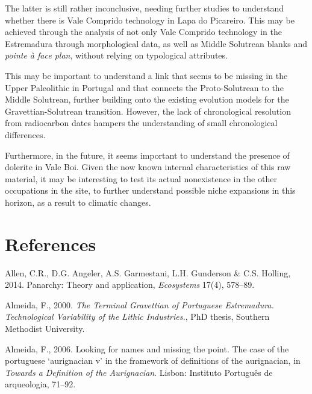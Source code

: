 \documentclass[12pt,twoside]{reedthesis}
\begin{document}
The latter is still rather inconclusive, needing further studies to understand whether there is Vale Comprido technology in Lapa do Picareiro. This may be achieved through the analysis of not only Vale Comprido technology in the Estremadura through morphological data, as well as Middle Solutrean blanks and \emph{pointe à face plan}, without relying on typological attributes.

This may be important to understand a link that seems to be missing in the Upper Paleolithic in Portugal and that connects the Proto-Solutrean to the Middle Solutrean, further building onto the existing evolution models for the Gravettian-Solutrean transition. However, the lack of chronological resolution from radiocarbon dates hampers the understanding of small chronological differences.

Furthermore, in the future, it seems important to understand the presence of dolerite in Vale Boi. Given the now known internal characteristics of this raw material, it may be interesting to test its actual nonexistence in the other occupations in the site, to further understand possible niche expansions in this horizon, as a result to climatic changes.

\hypertarget{references}{%
\chapter*{References}\label{references}}


\noindent
\singlespacing

\setlength{\parindent}{-0.20in}
\setlength{\leftskip}{0.20in}
\setlength{\parskip}{8pt}

\hypertarget{refs}{}
\leavevmode\hypertarget{ref-allen2014}{}%
Allen, C.R., D.G. Angeler, A.S. Garmestani, L.H. Gunderson \& C.S. Holling, 2014. Panarchy: Theory and application, \emph{Ecosystems} 17(4), 578--89.

\leavevmode\hypertarget{ref-almeida2000}{}%
Almeida, F., 2000. \emph{\textup{The Terminal Gravettian of Portuguese Estremadura. Technological Variability of the Lithic Industries.}}, PhD thesis, Southern Methodist University.

\leavevmode\hypertarget{ref-almeida2006}{}%
Almeida, F., 2006. Looking for names and missing the point. The case of the portuguese `aurignacian v' in the framework of definitions of the aurignacian, in \emph{Towards a Definition of the Aurignacian}. Lisbon: Instituto Português de arqueologia, 71--92.
\end{document}
